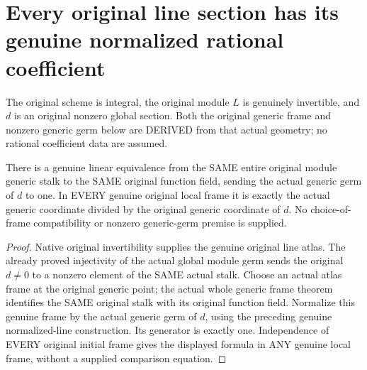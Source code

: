 \section{Every original line section has its genuine normalized rational coefficient}
\label{sec:line-section-ratios}

The original scheme is integral, the original module $L$ is genuinely
invertible, and $d$ is an original nonzero global section. Both the
original generic frame and nonzero generic germ below are DERIVED
from that actual geometry; no rational coefficient data are assumed.

\begin{theorem}
\label{sc0-line-section-ratios:whole-generic-frame}
\leanok
There is a genuine linear equivalence from the SAME entire original
module generic stalk to the SAME original function field, sending the
actual generic germ of $d$ to one. In EVERY genuine original local frame
it is exactly the actual generic coordinate divided by the original
generic coordinate of $d$. No choice-of-frame compatibility or nonzero
generic-germ premise is supplied.
\end{theorem}
\begin{proof}
Native original invertibility supplies the genuine original line atlas.
The already proved injectivity of the actual global module germ sends
the original $d\ne0$ to a nonzero element of the SAME actual stalk.
Choose an actual atlas frame at the original generic point; the actual
whole generic frame theorem identifies the SAME original stalk with
its original function field. Normalize this genuine frame by the
actual generic germ of $d$, using the preceding genuine normalized-line
construction. Its generator is exactly one. Independence of EVERY
original initial frame gives the displayed formula in ANY genuine
local frame, without a supplied comparison equation.
\end{proof}

